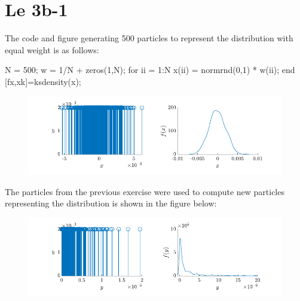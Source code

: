 \section{Le 3b-1}

The code and figure generating 500 particles to represent the distribution with equal weight is as follows:
\begin{matlabcode}
N = 500;
w = 1/N + zeros(1,N);
for ii = 1:N
    x(ii) = normrnd(0,1) * w(ii);
end
[fx,xk]=ksdensity(x); 
\end{matlabcode}
\begin{figure}[!h]
    \centering
    \includegraphics{figures/ex4_a.pdf}
\end{figure}


The particles from the previous exercise were used to compute new particles 
representing the distribution is shown in the figure below:
\begin{figure}[!h]
    \centering
    \includegraphics{figures/ex4_b.pdf}
\end{figure}

